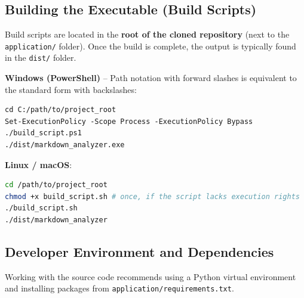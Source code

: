 \documentclass[12pt, a4paper]{article}
\begin{document}
\subsection{Building the Executable (Build Scripts)}

Build scripts are located in the \textbf{root of the cloned repository} (next to the \texttt{application/} folder). Once the build is complete, the output is typically found in the \texttt{dist/} folder.

\textbf{Windows (PowerShell)} -- Path notation with forward slashes is equivalent to the standard form with backslashes:

\begin{lstlisting}[basicstyle=\ttfamily\small]
cd C:/path/to/project_root
Set-ExecutionPolicy -Scope Process -ExecutionPolicy Bypass
./build_script.ps1
./dist/markdown_analyzer.exe
\end{lstlisting}

\textbf{Linux / macOS}:

\begin{lstlisting}[language=bash, basicstyle=\ttfamily\small]
cd /path/to/project_root
chmod +x build_script.sh # once, if the script lacks execution rights
./build_script.sh
./dist/markdown_analyzer
\end{lstlisting}

\subsection{Developer Environment and Dependencies}

Working with the source code recommends using a Python virtual 
environment and installing packages from \texttt{application/requirements.txt}.
\end{document}
